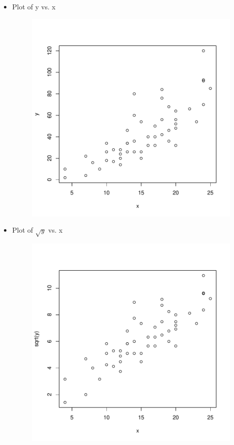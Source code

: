 \documentclass[12pt]{article}
\begin{document}
\begin{itemize}
\item Plot of y vs. x
\begin{figure}[H]
\includegraphics{HW3-001}
\end{figure}
\clearpage

\item Plot of $\sqrt{y}$ vs. x
\begin{figure}[H]
\includegraphics{HW3-002}
\end{figure}


\end{itemize}
\end{document}
